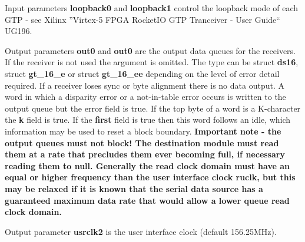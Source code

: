             Input parameters {\bf loopback0} and {\bf loopback1} control the
            loopback mode of each GTP - see Xilinx ''Virtex-5 FPGA RocketIO GTP
            Tranceiver - User Guide`` UG196.

            Output parameters {\bf out0} and {\bf out0} are the output data
            queues for the receivers. If the receiver is not used the argument is
            omitted. The type can be struct {\bf ds16}, struct {\bf gt\_16\_e}
            or  struct {\bf gt\_16\_ee} depending on the level of error detail
            required. If a receiver loses sync or byte alignment there is no
            data output. A word in which a disparity error or a not-in-table
            error occurs is written to the output queue but the error field is
            true. If the top byte of a word is a K-character the {\bf k} field
            is true. If the {\bf first} field is true then this word follows an
            idle, which information may be used to reset a block boundary. {\bf
            Important note - the output queues must not block! The destination
            module must read them at a rate that precludes them ever becoming
            full, if necessary reading them to null. Generally the read clock
            domain must have an equal or higher frequency than the user
            interface clock {\bf ruclk}, but this may be relaxed if it is known
            that the serial data source has a guaranteed maximum data rate that
            would allow a lower queue read clock domain.}

            Output parameter {\bf usrclk2} is the user interface clock (default
            156.25MHz).
            
